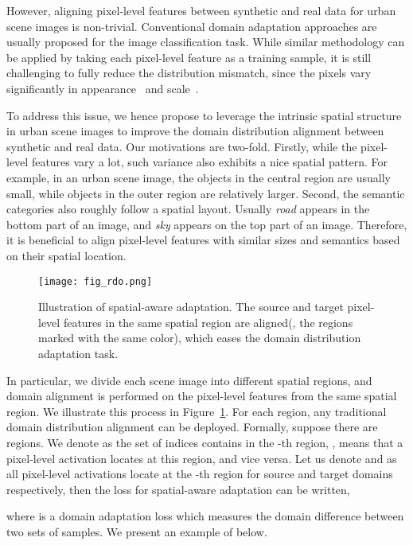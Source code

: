\documentclass[10pt,twocolumn,letterpaper]{article}
\begin{document}
However, aligning pixel-level features between synthetic and real data for urban scene images is non-trivial. Conventional domain adaptation approaches are usually proposed for the image classification task. While similar methodology can be applied by taking each pixel-level feature as a training sample, it is still challenging to fully reduce the distribution mismatch, since the pixels vary significantly in appearance~\cite{hoffman2016fcns} and scale~\cite{chen2016scale}.

To address this issue, we hence propose to leverage the intrinsic spatial structure in urban scene images to improve the domain distribution alignment between synthetic and real data. Our motivations are two-fold. Firstly, while the pixel-level features vary a lot, such variance also exhibits a nice spatial pattern. For example, in an urban scene image, the objects in the central region are usually small, while objects in the outer region are relatively larger. Second, the semantic categories also roughly follow a spatial layout. Usually \textit{road} appears in the bottom part of an image, and \textit{sky} appears on the top part of an image. Therefore, it is beneficial to align pixel-level features with similar sizes and semantics based on their spatial location.  

\begin{figure}
\centering
\texttt{[image: fig\_rdo.png]}
\caption{Illustration of spatial-aware adaptation. The source and target pixel-level features in the same spatial region are aligned(\ie, the regions marked with the same color), which eases the domain distribution adaptation task. }
\label{fig:fig_rdo}
\vspace{-4mm}
\end{figure}

In particular, we divide each scene image into different spatial regions, and domain alignment is performed on the pixel-level features from the same spatial region. We illustrate this process in Figure~\ref{fig:fig_rdo}. For each region, any traditional domain distribution alignment can be deployed. Formally, suppose there are  regions. We denote  as the set of indices contains in the -th region, \ie,  means that a pixel-level activation  locates at this region, and vice versa. Let us denote  and  as all pixel-level activations locate at the -th region for source and target domains respectively, then the loss for spatial-aware adaptation can be written,

where  is a domain adaptation loss which measures the domain difference between two sets of samples. We present an example of  below.
\end{document}
